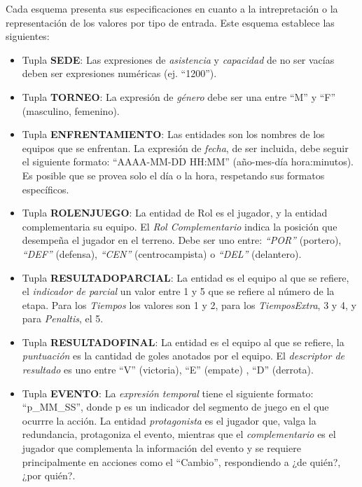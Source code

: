 Cada esquema presenta sus especificaciones en cuanto a la intrepretación o la representación de los 
valores por tipo de entrada. Este esquema establece las siguientes:

    \begin{itemize}
        \item Tupla \textbf{SEDE}: Las expresiones de \textit{asistencia} y \textit{capacidad} de no ser vacías deben ser expresiones numéricas (ej. “1200”).
        \item Tupla \textbf{TORNEO}: La expresión de \textit{género} debe ser una entre “M” y “F” (masculino, femenino). 
        \item Tupla \textbf{ENFRENTAMIENTO}: Las entidades son los nombres de los equipos que se enfrentan. La expresión de \textit{fecha}, de ser incluida, debe seguir
        el siguiente formato: “AAAA-MM-DD HH:MM” (año-mes-día hora:minutos). Es posible que se provea solo el día o la hora, respetando sus formatos específicos.
        \item Tupla \textbf{ROLENJUEGO}: La entidad de Rol es el jugador, y la entidad complementaria su equipo. El \textit{Rol Complementario} indica la posición que 
        desempeña el jugador en el terreno. Debe ser uno entre: \textit{“POR”} (portero), \textit{“DEF”} (defensa), \textit{“CEN”} (centrocampista) o \textit{“DEL”} (delantero).
        \item Tupla \textbf{RESULTADOPARCIAL}: La entidad es el equipo al que se refiere, el \textit{indicador de parcial} un valor entre 1 y 5 que se refiere al número de la etapa. Para  
        los \textit{Tiempos} los valores son 1 y 2, para los \textit{TiemposExtra}, 3 y 4, y para \textit{Penaltis}, el 5.
        \item Tupla \textbf{RESULTADOFINAL}: La entidad es el equipo al que se refiere, la \textit{puntuación} es la cantidad de goles anotados por el equipo. El \textit{descriptor de 
        resultado} es uno entre “V” (victoria), “E” (empate) , “D” (derrota).
        \item Tupla \textbf{EVENTO}: La \textit{expresión temporal} tiene el siguiente formato: “p\_MM\_SS”, donde p es un indicador del segmento de juego en el que ocurrre la acción. 
        La entidad \textit{protagonista} es el jugador que, valga la redundancia, protagoniza el evento, mientras que el \textit{complementario} es el jugador que complementa la 
        información del evento y se requiere principalmente en acciones como el “Cambio”, respondiendo a ¿de quién?, ¿por quién?.
    \end{itemize}

